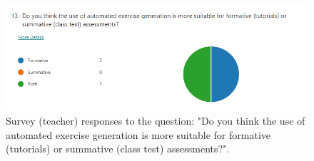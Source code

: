 \documentclass{l4proj}
\begin{document}
\begin{appendices}
\begin{figure}[h]
    \centering
    \includegraphics[width=0.9\linewidth]{images/t_summative_formative.png}    

    \caption{Survey (teacher) responses to the question: "Do you think the use of automated exercise generation is more suitable for formative (tutorials) or summative (class test) assessments?".}
    \label{fig:t_summative_formative} 
\end{figure}
\end{appendices}






\end{document}
